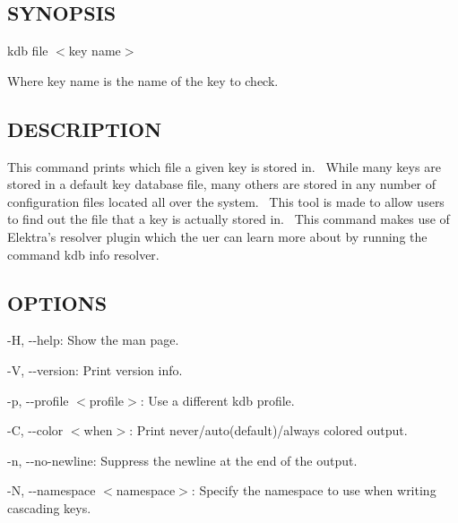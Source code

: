 \subsection*{S\+Y\+N\+O\+P\+S\+IS}

{\ttfamily kdb file $<$key name$>$}~\newline


Where {\ttfamily key name} is the name of the key to check.~\newline


\subsection*{D\+E\+S\+C\+R\+I\+P\+T\+I\+ON}

This command prints which file a given key is stored in.~\newline
 While many keys are stored in a default key database file, many others are stored in any number of configuration files located all over the system.~\newline
 This tool is made to allow users to find out the file that a key is actually stored in.~\newline
 This command makes use of Elektra’s {\ttfamily resolver} plugin which the uer can learn more about by running the command {\ttfamily kdb info resolver}.

\subsection*{O\+P\+T\+I\+O\+NS}


\begin{DoxyItemize}
\item {\ttfamily -\/H}, {\ttfamily -\/-\/help}\+: Show the man page.
\item {\ttfamily -\/V}, {\ttfamily -\/-\/version}\+: Print version info.
\item {\ttfamily -\/p}, {\ttfamily -\/-\/profile $<$profile$>$}\+: Use a different kdb profile.
\item {\ttfamily -\/C}, {\ttfamily -\/-\/color $<$when$>$}\+: Print never/auto(default)/always colored output.
\item {\ttfamily -\/n}, {\ttfamily -\/-\/no-\/newline}\+: Suppress the newline at the end of the output.
\item {\ttfamily -\/N}, {\ttfamily -\/-\/namespace $<$namespace$>$}\+: Specify the namespace to use when writing cascading keys.
\end{DoxyItemize}

